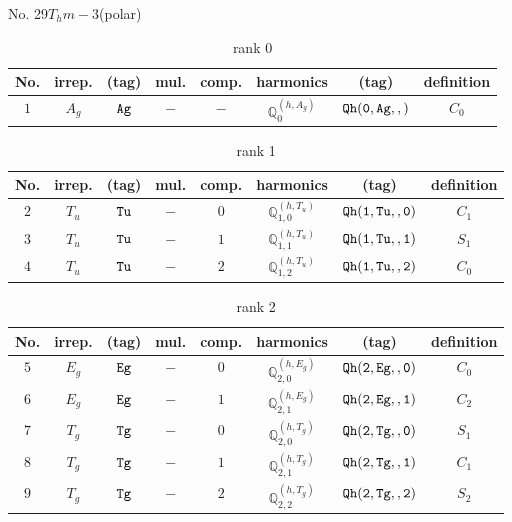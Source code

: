 \documentclass[fleqn,8pt]{jsarticle}
\begin{document}
\setcounter{MaxMatrixCols}{16}

\begin{center}
\LARGE
No. 29\quad$T_{h}$\quad$m-3$\quad[ cubic ] (polar)
\end{center}
\begin{table}[ht!]
\begin{center}
\caption{rank 0}
\renewcommand{\arraystretch}{1.3}
\begin{tabular}{cccccccc} \hline \hline
No. & irrep. & (tag) & mul. & comp. & harmonics & (tag) & definition \\ \hline
$ 1 $ & $ A_{g} $ & $ {\tt Ag} $ & $ - $ & $ - $ & $ \mathbb{Q}_{0}^{(h,A_{g})} $ & $ {\tt Qh(0,Ag,,)} $ & $ C_{0} $ \\
 \hline \hline
\end{tabular}
\end{center}
\end{table}
\begin{table}[ht!]
\begin{center}
\caption{rank 1}
\renewcommand{\arraystretch}{1.3}
\begin{tabular}{cccccccc} \hline \hline
No. & irrep. & (tag) & mul. & comp. & harmonics & (tag) & definition \\ \hline
$ 2 $ & $ T_{u} $ & $ {\tt Tu} $ & $ - $ & $ 0 $ & $ \mathbb{Q}_{1,0}^{(h,T_{u})} $ & $ {\tt Qh(1,Tu,,0)} $ & $ C_{1} $ \\
$ 3 $ & $ T_{u} $ & $ {\tt Tu} $ & $ - $ & $ 1 $ & $ \mathbb{Q}_{1,1}^{(h,T_{u})} $ & $ {\tt Qh(1,Tu,,1)} $ & $ S_{1} $ \\
$ 4 $ & $ T_{u} $ & $ {\tt Tu} $ & $ - $ & $ 2 $ & $ \mathbb{Q}_{1,2}^{(h,T_{u})} $ & $ {\tt Qh(1,Tu,,2)} $ & $ C_{0} $ \\
 \hline \hline
\end{tabular}
\end{center}
\end{table}
\begin{table}[ht!]
\begin{center}
\caption{rank 2}
\renewcommand{\arraystretch}{1.3}
\begin{tabular}{cccccccc} \hline \hline
No. & irrep. & (tag) & mul. & comp. & harmonics & (tag) & definition \\ \hline
$ 5 $ & $ E_{g} $ & $ {\tt Eg} $ & $ - $ & $ 0 $ & $ \mathbb{Q}_{2,0}^{(h,E_{g})} $ & $ {\tt Qh(2,Eg,,0)} $ & $ C_{0} $ \\
$ 6 $ & $ E_{g} $ & $ {\tt Eg} $ & $ - $ & $ 1 $ & $ \mathbb{Q}_{2,1}^{(h,E_{g})} $ & $ {\tt Qh(2,Eg,,1)} $ & $ C_{2} $ \\
$ 7 $ & $ T_{g} $ & $ {\tt Tg} $ & $ - $ & $ 0 $ & $ \mathbb{Q}_{2,0}^{(h,T_{g})} $ & $ {\tt Qh(2,Tg,,0)} $ & $ S_{1} $ \\
$ 8 $ & $ T_{g} $ & $ {\tt Tg} $ & $ - $ & $ 1 $ & $ \mathbb{Q}_{2,1}^{(h,T_{g})} $ & $ {\tt Qh(2,Tg,,1)} $ & $ C_{1} $ \\
$ 9 $ & $ T_{g} $ & $ {\tt Tg} $ & $ - $ & $ 2 $ & $ \mathbb{Q}_{2,2}^{(h,T_{g})} $ & $ {\tt Qh(2,Tg,,2)} $ & $ S_{2} $ \\
 \hline \hline
\end{tabular}
\end{center}
\end{table}
\end{document}

